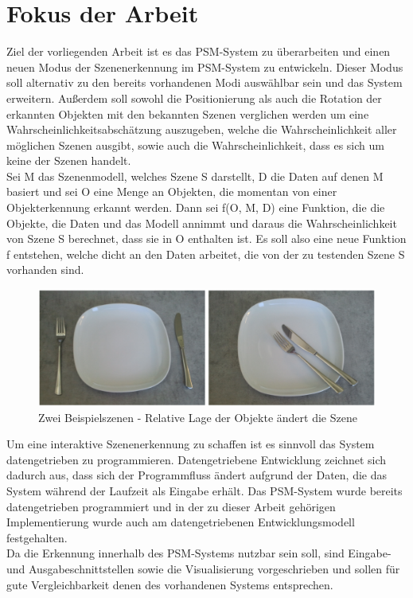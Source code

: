 \section{Fokus der Arbeit}
Ziel der vorliegenden Arbeit ist es das PSM-System zu überarbeiten und einen neuen Modus der Szenenerkennung im PSM-System zu entwickeln. Dieser Modus soll alternativ zu den bereits vorhandenen Modi auswählbar sein und das System erweitern. Außerdem soll sowohl die Positionierung als auch die Rotation der erkannten Objekten mit den bekannten Szenen verglichen werden um eine Wahrscheinlichkeitsabschätzung auszugeben, welche die Wahrscheinlichkeit aller möglichen Szenen ausgibt, sowie auch die Wahrscheinlichkeit, dass es sich um keine der Szenen  handelt.\smallskip\\
Sei M das Szenenmodell, welches Szene S darstellt, D die Daten auf denen M basiert und sei O eine Menge an Objekten, die momentan von einer Objekterkennung erkannt werden. Dann sei f(O, M,  D) eine Funktion, die die Objekte, die Daten und das Modell annimmt und daraus die Wahrscheinlichkeit von Szene S berechnet, dass sie in O enthalten ist. Es soll also eine neue Funktion f entstehen, welche dicht an den Daten arbeitet, die von der zu testenden Szene S vorhanden sind.\smallskip\\
\begin{figure}
	\centering
	\includegraphics[width=14cm]{bilder/SzenenBeispiel.pdf}
	\caption{Zwei Beispielszenen - Relative Lage der Objekte ändert die Szene \cite{gehrung14}}
	\label{img:relativeLage}
\end{figure}
Um eine interaktive Szenenerkennung zu schaffen ist es sinnvoll das System datengetrieben zu programmieren. Datengetriebene Entwicklung zeichnet sich dadurch aus, dass sich der Programmfluss ändert aufgrund der Daten, die das System während der Laufzeit als Eingabe erhält. Das PSM-System wurde bereits datengetrieben programmiert und in der zu dieser Arbeit gehörigen Implementierung wurde auch am datengetriebenen Entwicklungsmodell festgehalten.\smallskip\\ 
Da die Erkennung innerhalb des PSM-Systems nutzbar sein soll, sind Eingabe- und Ausgabeschnittstellen sowie die Visualisierung vorgeschrieben und sollen für gute Vergleichbarkeit denen des vorhandenen Systems entsprechen.\smallskip\\
